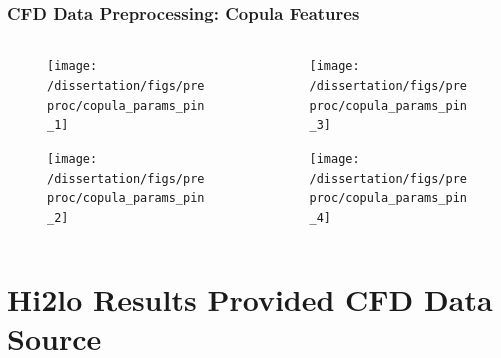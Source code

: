 \documentclass[t, pdftex]{beamer}
\begin{document}
\begin{frame}
\frametitle{CFD Data Preprocessing: Copula Features}
\vspace{-42pt}
\begin{columns}
    \begin{column}{0.5\textwidth}
        \begin{figure}[H]%
            \texttt{[image: /dissertation/figs/preproc/copula\_params\_pin\_1]}
        \end{figure}
    \vspace{-26pt}
            \begin{figure}[H]%
                \texttt{[image: /dissertation/figs/preproc/copula\_params\_pin\_2]}
            \end{figure}
    \end{column}
    \begin{column}{0.5\textwidth}
        \begin{figure}[H]%
            \texttt{[image: /dissertation/figs/preproc/copula\_params\_pin\_3]}
        \end{figure}
    \vspace{-26pt}
            \begin{figure}[H]%
                \texttt{[image: /dissertation/figs/preproc/copula\_params\_pin\_4]}
            \end{figure}
\end{column}
\end{columns}
\end{frame}

\section[Results]{Hi2lo Results Provided CFD Data Source}
\end{document}
